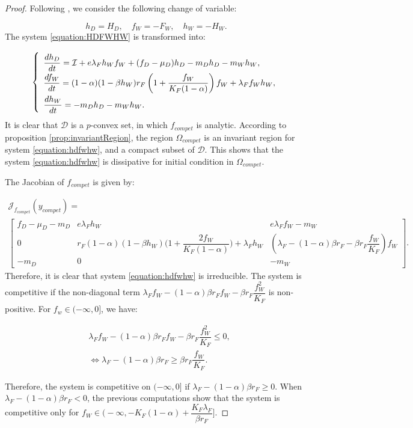 \documentclass{article}
\newcommand{\lfw}{\lambda_{F}}
\newcommand{\lfw}{\lambda_{F}}
\newcommand{\cI}{\mathcal{I}}
\theoremstyle{definition}
\theoremstyle{remark}
\begin{document}
\begin{proof}
Following \cite{wang_predator-prey_1997}, we consider the following change of variable: 

\begin{equation}\label{equation:change of variable}
h_D =  H_D, \quad f_W = -F_W, \quad h_W = -H_W.
\end{equation} The system \eqref{equation:HDFWHW} is transformed into:

\begin{equation}
\def\arraystretch{2}
\left\{ \begin{array}{l}
\dfrac{dh_D}{dt}= \cI + e\lfw h_W f_W + (f_D - \mu_D) h_D - m_D h_D - m_W h_W, \\
\dfrac{df_W}{dt} = (1-\alpha)(1 - \beta h_W) r_F \left(1 + \dfrac{f_W}{K_F(1-\alpha)} \right) f_W + \lfw f_W h_W, \\
\dfrac{dh_W}{dt}= -m_D h_D - m_W h_W.
\end{array} \right.
\end{equation}
It is clear that $\mathcal{D}$ is a $p$-convex set, in which $f_{compet}$ is analytic. According to proposition \ref{prop:invariantRegion}, the region $\Omega_{compet}$ is an invariant region for system \eqref{equation:hdfwhw}, and a compact subset of $\mathcal{D}$. This shows that the system \eqref{equation:hdfwhw} is dissipative for initial condition in  $\Omega_{compet}$.

The Jacobian of $f_{compet}$ is given by:

{\footnotesize
\begin{multline}
\mathcal{J}_{f_{compet}}(y_{compet}) = \\ \begin{bmatrix}
f_D -\mu_D - m_D & e \lfw h_W & e \lfw f_W - m_W \\
0 & r_F (1-\alpha)(1-\beta h_W) \Big(1 + \dfrac{2 f_W}{K_F(1-\alpha)}\Big) + \lfw  h_W & \left(\lfw- (1-\alpha)\beta r_F - \beta r_F \dfrac{f_W}{K_F} \right)f_W\\
-m_D & 0 & -m_W
\end{bmatrix}.
\label{equation:jacobianMatrix compet}
\end{multline}}
Therefore, it is clear that system \eqref{equation:hdfwhw} is irreducible. The system is competitive if the non-diagonal term $\lfw f_W - (1-\alpha)\beta r_F f_W - \beta r_F \dfrac{f_W^2}{K_F}$ is non-positive. For $f_w \in (-\infty, 0]$, we have:

\begin{align*}
&\lfw f_W - (1-\alpha)\beta r_F f_W - \beta r_F \dfrac{f_W^2}{K_F} \leq 0, \\
&\Leftrightarrow \lfw - (1-\alpha)\beta r_F \geq \beta r_F \dfrac{f_W}{K_F}.
\end{align*}

Therefore, the system is competitive on $(-\infty, 0]$ if $\lfw - (1-\alpha)\beta r_F \geq 0$. When $\lfw - (1-\alpha)\beta r_F<0$, the previous computations show that the system is competitive only for $f_W \in \Big(-\infty, -K_F(1-\alpha) + \dfrac{K_F \lfw}{\beta r_F}\Big]$. 
\end{proof}
\end{document}

